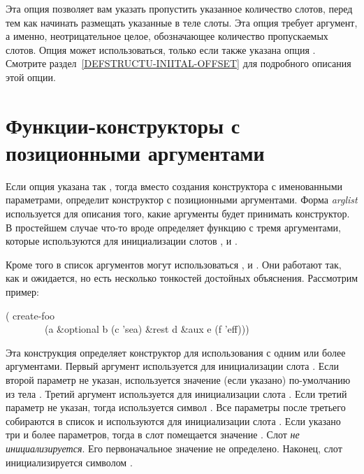 \begin{flushdesc}
\item[\cd{:initial-offset}]
Эта опция позволяет вам указать  пропустить указанное количество
слотов, перед тем как начинать размещать указанные в теле слоты. Эта опция
требует аргумент, а именно, неотрицательное целое, обозначающее количество
пропускаемых слотов.
Опция  может использоваться, только если также указана опция
.
Смотрите раздел~\ref{DEFSTRUCTU-INIITAL-OFFSET} для подробного описания этой
опции.
\end{flushdesc}

\section{Функции-конструкторы с позиционными аргументами}
\label{DEFSTRUCT-CONSTRUCTOR-SYNTAX}

Если опция  указана так , тогда вместо создания конструктора с именованными
параметрами,  определит конструктор с позиционными аргументами.
Форма \emph{arglist} используется для описания того, какие аргументы будет
принимать конструктор. В простейшем случае что-то вроде  определяет функцию  с тремя аргументами,
которые используются для инициализации слотов ,  и .

Кроме того в список аргументов могут использоваться , 
и . Они работают так, как и ожидается, но есть несколько тонкостей
достойных объяснения. Рассмотрим пример:
\begin{lisp}
( create-foo \\
~~~~~~~~(a \&optional b (c 'sea) \&rest d \&aux e (f 'eff)))
\end{lisp}
Эта конструкция определяет конструктор  для использования с
одним или более аргументами. Первый аргумент используется для инициализации
слота . Если второй параметр не указан, используется значение (если
указано) по-умолчанию из тела . Третий аргумент используется для
инициализации слота . Если третий параметр не указан, тогда используется
символ . Все параметры после третьего собираются в список и
используются для инициализации слота . Если указано три и более
параметров, тогда в слот  помещается значение {\false}. Слот 
\emph{не инициализируется}. Его первоначальное значение не определено. Наконец,
слот  инициализируется символом .

